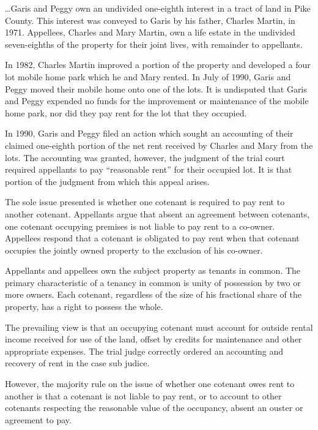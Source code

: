 

\dots Garis and Peggy own an undivided one-eighth interest in a tract of land
in Pike County. This interest was conveyed to Garis by his father, Charles
Martin, in 1971. Appellees, Charles and Mary Martin, own a life estate in the
undivided seven-eighths of the property for their joint lives, with remainder
to appellants.

In 1982, Charles Martin improved a portion of the property and developed a four
lot mobile home park which he and Mary rented. In July of 1990, Garis and Peggy
moved their mobile home onto one of the lots. It is undisputed that Garis and
Peggy expended no funds for the improvement or maintenance of the mobile home
park, nor did they pay rent for the lot that they occupied.

In 1990, Garis and Peggy filed an action which sought an accounting of their
claimed one-eighth portion of the net rent received by Charles and Mary from
the lots. The accounting was granted, however, the judgment of the trial court
required appellants to pay ``reasonable rent'' for their occupied lot. It is
that portion of the judgment from which this appeal arises.

The sole issue presented is whether one cotenant is required to pay rent to
another cotenant. Appellants argue that absent an agreement between cotenants,
one cotenant occupying premises is not liable to pay rent to a co-owner.
Appellees respond that a cotenant is obligated to pay rent when that cotenant
occupies the jointly owned property to the exclusion of his co-owner.

Appellants and appellees own the subject property as tenants in common. The
primary characteristic of a tenancy in common is unity of possession by two or
more owners. Each cotenant, regardless of the size of his fractional share of
the property, has a right to possess the whole.

The prevailing view is that an occupying cotenant must account for outside
rental income received for use of the land, offset by credits for maintenance
and other appropriate expenses. The trial judge correctly ordered an accounting
and recovery of rent in the case sub judice.

However, the majority rule on the issue of whether one cotenant owes rent to
another is that a cotenant is not liable to pay rent, or to account to other
cotenants respecting the reasonable value of the occupancy, absent an ouster or
agreement to pay.

